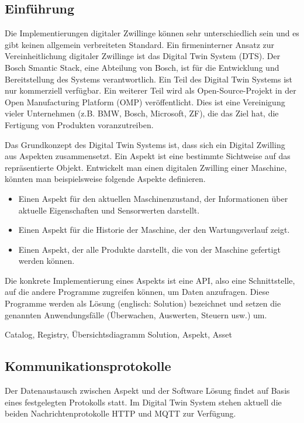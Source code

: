 	\subsection{Einführung}
	Die Implementierungen digitaler Zwillinge können sehr unterschiedlich sein und es gibt keinen allgemein verbreiteten Standard. Ein firmeninterner Ansatz zur Vereinheitlichung digitaler Zwillinge ist das Digital Twin System (DTS). Der Bosch Smantic Stack, eine Abteilung von Bosch, ist für die Entwicklung und Bereitstellung des Systems verantwortlich. Ein Teil des Digital Twin Systems ist nur kommerziell verfügbar. Ein weiterer Teil wird als Open-Source-Projekt in der Open Manufacturing Platform (OMP) veröffentlicht. Dies ist eine Vereinigung vieler Unternehmen (z.B. BMW, Bosch, Microsoft, ZF), die das Ziel hat, die Fertigung von Produkten voranzutreiben. \cite[vgl.][]{omp2020omp}
	
	Das Grundkonzept des Digital Twin Systems ist, dass sich ein Digital Zwilling aus Aspekten zusammensetzt. Ein Aspekt ist eine bestimmte Sichtweise auf das repräsentierte Objekt. Entwickelt man einen digitalen Zwilling einer Maschine, könnten man beispielsweise folgende Aspekte definieren. 
	\begin{itemize}
		\item Einen Aspekt für den aktuellen Maschinenzustand, der Informationen über aktuelle Eigenschaften und Sensorwerten darstellt.
		\item Einen Aspekt für die Historie der Maschine, der den Wartungsverlauf zeigt.
		\item Einen Aspekt, der alle Produkte darstellt, die von der Maschine gefertigt werden können.
	\end{itemize}
	
	Die konkrete Implementierung eines Aspekts ist eine API, also eine Schnittstelle, auf die andere Programme zugreifen können, um Daten anzufragen. Diese Programme werden als Lösung (englisch: Solution) bezeichnet und setzen die genannten Anwendungsfälle (Überwachen, Auswerten, Steuern usw.) um.
	
	{\color{red} Catalog, Registry, Übersichtsdiagramm Solution, Aspekt, Asset}

	\subsection{Kommunikationsprotokolle}
	
	Der Datenaustausch zwischen Aspekt und der Software Lösung findet auf Basis eines festgelegten Protokolls statt. Im Digital Twin System stehen aktuell die beiden Nachrichtenprotokolle HTTP und MQTT zur Verfügung. 
	

